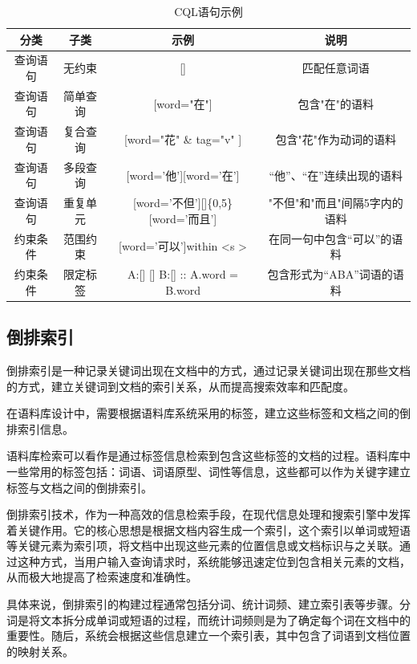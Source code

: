 \documentclass[11pt]{article}
\begin{document}
\begin{CJK*}{UTF8}{gbsn}
\begin{table}[h]
	\begin{center}
		\begin{tabular}{|c|c|c|c|}
			\hline \bf 分类 & \bf 子类 & \bf 示例 & \bf 说明 \\ \hline
			查询语句 & 无约束 & [] & 匹配任意词语 \\
			查询语句 & 简单查询 & [word="在"] & 包含"在"的语料 \\
			查询语句 & 复合查询 & [word="花" \& tag="v" ] & 包含"花"作为动词的语料 \\
			查询语句 & 多段查询 & [word='他'][word='在'] & “他”、“在”连续出现的语料 \\
			查询语句 & 重复单元 & [word='不但'][]\{0,5\}[word='而且'] & "不但"和"而且"间隔5字内的语料 \\
			约束条件 & 范围约束 & [word='可以']within \textless s \textgreater & 在同一句中包含“可以”的语料 \\
			约束条件 & 限定标签 & A:[] [] B:[]  :: A.word = B.word	 & 包含形式为“ABA”词语的语料 \\
			\hline
		\end{tabular}
	\end{center}
	\caption{\label{font-table} CQL语句示例}
\end{table}

\subsection{倒排索引}

倒排索引是一种记录关键词出现在文档中的方式，通过记录关键词出现在那些文档的方式，建立关键词到文档的索引关系，从而提高搜索效率和匹配度。

在语料库设计中，需要根据语料库系统采用的标签，建立这些标签和文档之间的倒排索引信息。

语料库检索可以看作是通过标签信息检索到包含这些标签的文档的过程。语料库中一些常用的标签包括：词语、词语原型、词性等信息，这些都可以作为关键字建立标签与文档之间的倒排索引。

倒排索引技术，作为一种高效的信息检索手段，在现代信息处理和搜索引擎中发挥着关键作用。它的核心思想是根据文档内容生成一个索引，这个索引以单词或短语等关键元素为索引项，将文档中出现这些元素的位置信息或文档标识与之关联。通过这种方式，当用户输入查询请求时，系统能够迅速定位到包含相关元素的文档，从而极大地提高了检索速度和准确性。

具体来说，倒排索引的构建过程通常包括分词、统计词频、建立索引表等步骤。分词是将文本拆分成单词或短语的过程，而统计词频则是为了确定每个词在文档中的重要性。随后，系统会根据这些信息建立一个索引表，其中包含了词语到文档位置的映射关系。


\end{CJK*}
\end{document}
